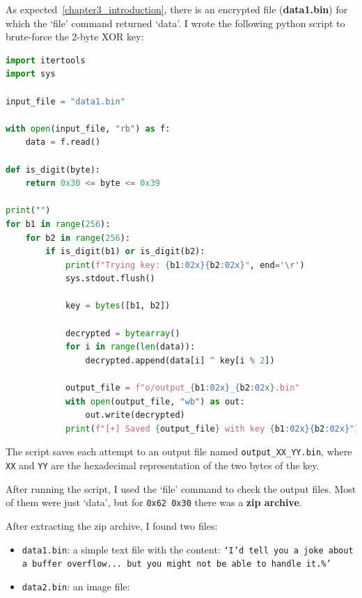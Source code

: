 \documentclass[pdflatex,sn-mathphys-num]{sn-jnl}
\begin{document}
\par As expected~\ref{chapter3_introduction}, there is an encrypted file (\textbf{data1.bin}) for which the `file' command
returned `data'. I wrote the following python script to brute-force the 2-byte XOR key:

\begin{lstlisting}[language=Python, style=pythonstyle]
import itertools
import sys

input_file = "data1.bin"

with open(input_file, "rb") as f:
    data = f.read()

def is_digit(byte):
    return 0x30 <= byte <= 0x39

print("")
for b1 in range(256):
    for b2 in range(256):
        if is_digit(b1) or is_digit(b2):
            print(f"Trying key: {b1:02x}{b2:02x}", end='\r')
            sys.stdout.flush()

            key = bytes([b1, b2])
            
            decrypted = bytearray()
            for i in range(len(data)):
                decrypted.append(data[i] ^ key[i % 2])
            
            output_file = f"o/output_{b1:02x}_{b2:02x}.bin"
            with open(output_file, "wb") as out:
                out.write(decrypted)
            print(f"[+] Saved {output_file} with key {b1:02x}{b2:02x}")
\end{lstlisting}

\par The script saves each attempt to an output file named \texttt{output\_XX\_YY.bin}, where \texttt{XX} and
\texttt{YY} are the
hexadecimal representation of the two bytes of the key.

\par After running the script, I used the `file' command to check the output files. Most of them were just `data', but
for \texttt{0x62 0x30} there was a \textbf{zip archive}.

\par After extracting the zip archive, I found two files:

\begin{itemize}
    \item \texttt{data1.bin}: a simple text file with the content: \texttt{`I'd tell you a joke about a buffer overflow...
        but you might not be able to handle it.\%'}
    \item \texttt{data2.bin}: an image file:
\end{itemize}
\end{document}
